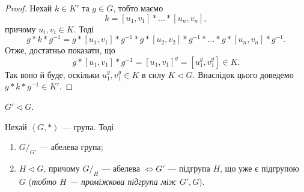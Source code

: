\documentclass{math_library}
\begin{document}
\begin{proof}
Нехай $k \in K'$ та $g \in G$, тобто маємо 
\[
k = [u_1,v_1]* \dots *[u_n,v_n],
\]
причому $u_i,v_i \in K$. Тоді
\[
g*k*g^{-1} = g*[u_1,v_1]*g^{-1}*g*[u_2,v_2]*g^{-1}*\dots*g*[u_n,v_n]*g^{-1}.
\]
Отже, достатньо показати, що
\[
g*[u_1,v_1]*g^{-1} = [u_1,v_1]^g = [u_1^g,v_1^g] \in K.
\]
Так воно й буде, оскільки $u_1^g,v_1^g \in K$ в силу $K \triangleleft G$. Внаслідок цього доведемо $g*k*g^{-1} \in K'$.
\end{proof}

\begin{corollary}
$G' \triangleleft G$.
\end{corollary}

\begin{theorem}
Нехай $\left<G,*\right>$ --- група. Тоді
\begin{enumerate}[nosep,wide=0pt,label={\arabic*)}]
\item $G/_{G'}$ --- абелева група;
\item $H \triangleleft G$, причому $G/_H$ --- абелева $\iff G'$ --- підгрупа $H$, що уже є підгрупою $G$ (\textit{тобто $H$ --- проміжкова підгрупа між $G',G$}).
\end{enumerate}
\end{theorem}
\end{document}
